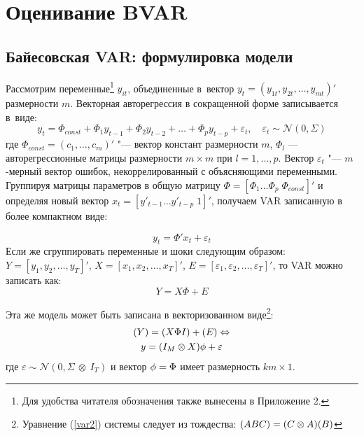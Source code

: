 \documentclass[11pt]{article} %
\DeclareMathOperator{\E}{\mathbb{E}}
\newcommand{\cN}{\mathcal{N}}
\let\vec\relax
\DeclareMathOperator{\vec}{vec}
\begin{document}
\section{Оценивание BVAR}


\subsection{Байесовская VAR: формулировка модели}
Рассмотрим переменные\footnote{Для удобства читателя обозначения также вынесены в Приложение 2.} $y_{it}$, объединенные в~вектор  $y_{t}=(y_{1t},y_{2t},\ldots, y_{mt})'$ размерности $m$. Векторная авторегрессия в сокращенной форме записывается в~виде:
\begin{equation}
y_t =\Phi_{const}+ \Phi_1 y_{t-1} + \Phi_2 y_{t-2} +\ldots + \Phi_p y_{t-p} + \varepsilon_t,\quad \varepsilon_t\sim \cN(0,\Sigma)
\end{equation}
где $\Phi_{const}=(c_1,\ldots ,c_m)'$ "--- вектор констант размерности $m$, $\Phi_l$ --– авторегрессионные матрицы размерности $m\times m$ при $l=1, \ldots, p$. Вектор $\varepsilon_t$ "--- $m$-мерный вектор ошибок, %
некоррелированный с объясняющими переменными.
Группируя матрицы параметров в общую матрицу $\Phi=[\Phi_1 \ldots \Phi_p \; \Phi_{const}]'$ %
и определяя новый вектор $x_t=[ y'_{t-1} \ldots  y'_{t-p} \; 1]'$, получаем VAR записанную в более компактном виде:

\begin{equation}
y_t=\Phi' x_t+\varepsilon_t
\end{equation}
Если же сгруппировать переменные  и шоки следующим образом: $Y=[y_1, y_2,\ldots, y_T]'$, $X=[x_1, x_2,\ldots, x_T]'$, $E=[\varepsilon_1, \varepsilon_2,\ldots, \varepsilon_T]'$, то VAR можно записать как:
\begin{equation}
Y=X\Phi+E\label{var}
\end{equation}

Эта же модель может быть записана в векторизованном виде\footnote{Уравнение (\ref{var2}) системы следует из тождества: $\vec(ABC)=(C\otimes A)\vec (B)$}:
\begin{gather}
\vec(Y)=\vec(X\Phi I)+\vec(E)\Leftrightarrow \\
y=(I_M\otimes X)\phi + \varepsilon \label{var2}
\end{gather}
где $\varepsilon  \sim \cN(0,\Sigma\ \otimes\ I_T)$ и вектор $\phi=\vec{\Phi}$ имеет размерность $km\times 1$.
\end{document}

